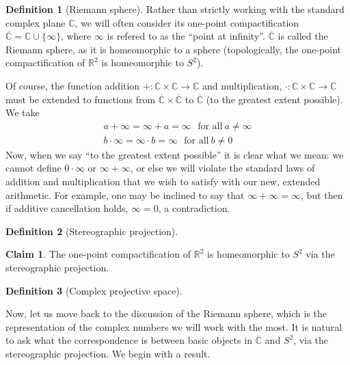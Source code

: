 \documentclass[aps,pra,showpacs,notitlepage,onecolumn,superscriptaddress,nofootinbib]{revtex4-1}
\theoremstyle{definition}
\newtheorem{definition}{Definition}[section]
\newtheorem{claim}{Claim}[section]
\begin{document}
\begin{definition}[Riemann sphere]
  Rather than strictly working with the standard complex plane $\mathbb{C}$, we will often consider its one-point compactification $\overline{\mathbb{C}} = \mathbb{C} \cup \{\infty\}$, where $\infty$ is refered to as the ``point at infinity''.
  $\overline{\mathbb{C}}$ is called the Riemann sphere, as it is homeomorphic to a sphere (topologically, the one-point compactification of $\mathbb{R}^2$ is homeomorphic to $S^2$).

  Of course, the function addition $+ : \mathbb{C} \times \mathbb{C} \rightarrow \mathbb{C}$ and multiplication, $\cdot : \mathbb{C} \times \mathbb{C} \rightarrow \mathbb{C}$ must be extended to functions from $\overline{\mathbb{C}} \times \overline{\mathbb{C}}$ 
  to $\overline{\mathbb{C}}$ (to the greatest extent possible). We take
  \begin{align}
    a + \infty = \infty + a = \infty \ \ \ \text{for all} \ a \neq \infty \\
    b \cdot \infty = \infty \cdot b = \infty \ \ \ \text{for all} \ b \neq 0
  \end{align}
  Now, when we say ``to the greatest extent possible'' it is clear what we mean: we cannot define $0 \cdot \infty$ or $\infty + \infty$, or else we will violate the standard laws of addition and multiplication that we wish to satisfy with our new, extended arithmetic.
  For example, one may be inclined to say that $\infty + \infty = \infty$, but then if additive cancellation holds, $\infty = 0$, a contradiction.
\end{definition}

\begin{definition}[Stereographic projection]
  \end{definition}

\begin{claim}
  The one-point compactification of $\mathbb{R}^2$ is homeomorphic to $S^2$ via the stereographic projection.
\end{claim}

\begin{definition}[Complex projective space]
\end{definition}

\noindent Now, let us move back to the discussion of the Riemann sphere, which is the representation of the complex numbers we will work with the most. It is natural
to ask what the correspondence is between basic objects in $\overline{\mathbb{C}}$ and $S^2$, via the stereographic projection. We begin with a result.
\end{document}

